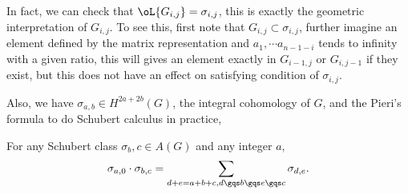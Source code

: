 \documentclass[a4paper, twoside]{article}
\begin{document}
In fact, we can check that $\oL{G_{i,j}}=\sigma_{i,j}$, this is exactly the geometric interpretation of $G_{i,j}$. To see this, first note that $G_{i,j}\subset\sigma_{i,j}$, further imagine an element defined by the matrix representation and $a_1,\cdots a_{n-1-i}$ tends to infinity with a given ratio, this will gives an element exactly in $G_{i-1,j}$ or $G_{i,j-1}$ if they exist, but this does not have an effect on satisfying condition of $\sigma_{i,j}$.

Also, we have $\sigma_{a,b}\in H^{2a+2b}(G)$, the integral cohomology of $G$, and the Pieri's formula to do Schubert calculus in practice,
\begin{thm}
	For any Schubert class $\sigma_b,c\in A(G)$ and any integer $a$,
	$$
	\sigma_{a,0}\cdot\sigma_{b,c}=\sum_{d+e=a+b+c, d\gqs b\gqs e\gqs c}\sigma_{d,e}.
	$$
\end{thm}
\end{document}
